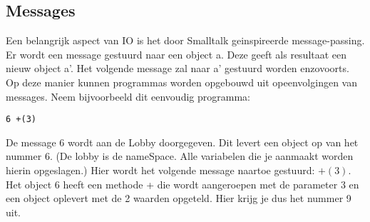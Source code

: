 \documentclass[12pt]{article}
\begin{document}
\subsection{Messages}
Een belangrijk aspect van IO is het door Smalltalk geinspireerde message-passing. Er wordt een message gestuurd naar een object a. Deze geeft als resultaat een nieuw object a'. Het volgende message zal naar a' gestuurd worden enzovoorts.  Op deze manier kunnen programmas worden opgebouwd uit opeenvolgingen van messages. Neem bijvoorbeeld dit eenvoudig programma:
\begin{lstlisting}[frame=single]
6 +(3)
\end{lstlisting}
De message 6 wordt aan de Lobby doorgegeven. Dit levert een object op van het nummer $6$. (De lobby is de nameSpace. Alle variabelen die je aanmaakt worden hierin opgeslagen.) Hier wordt het volgende message naartoe gestuurd: $+(3)$. Het object 6 heeft een methode + die wordt aangeroepen met de parameter 3 en een object oplevert met de 2 waarden opgeteld. Hier krijg je dus het nummer 9 uit.  

\end{document}
